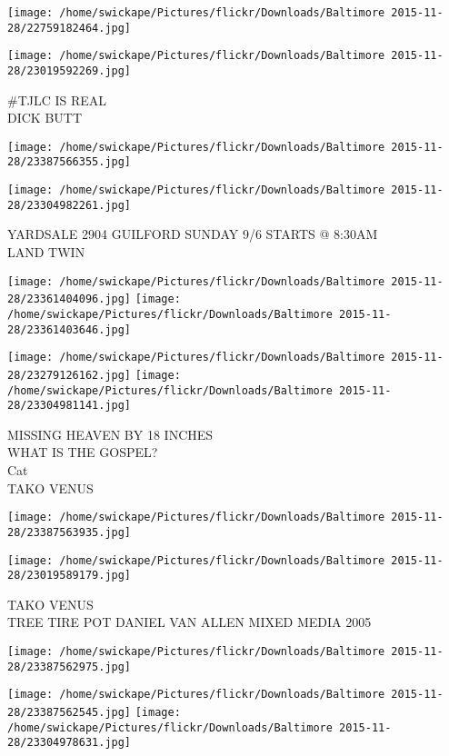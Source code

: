 \documentclass[10pt,letterpaper]{article}
\begin{document}
\texttt{[image: /home/swickape/Pictures/flickr/Downloads/Baltimore 2015-11-28/22759182464.jpg]}

\vspace{0.25in}
\texttt{[image: /home/swickape/Pictures/flickr/Downloads/Baltimore 2015-11-28/23019592269.jpg]}

\#TJLC IS REAL\\
DICK BUTT
\pagebreak

\texttt{[image: /home/swickape/Pictures/flickr/Downloads/Baltimore 2015-11-28/23387566355.jpg]}

\vspace{0.25in}
\texttt{[image: /home/swickape/Pictures/flickr/Downloads/Baltimore 2015-11-28/23304982261.jpg]}

YARDSALE 2904 GUILFORD SUNDAY 9/6 STARTS @ 8:30AM\\
LAND TWIN
\pagebreak

\texttt{[image: /home/swickape/Pictures/flickr/Downloads/Baltimore 2015-11-28/23361404096.jpg]}
\texttt{[image: /home/swickape/Pictures/flickr/Downloads/Baltimore 2015-11-28/23361403646.jpg]}

\texttt{[image: /home/swickape/Pictures/flickr/Downloads/Baltimore 2015-11-28/23279126162.jpg]}
\texttt{[image: /home/swickape/Pictures/flickr/Downloads/Baltimore 2015-11-28/23304981141.jpg]}

MISSING HEAVEN BY 18 INCHES\\
WHAT IS THE GOSPEL?\\
Cat\\
TAKO VENUS
\pagebreak

\texttt{[image: /home/swickape/Pictures/flickr/Downloads/Baltimore 2015-11-28/23387563935.jpg]}

\vspace{0.25in}
\texttt{[image: /home/swickape/Pictures/flickr/Downloads/Baltimore 2015-11-28/23019589179.jpg]}

TAKO VENUS\\
TREE TIRE POT DANIEL VAN ALLEN MIXED MEDIA 2005
\pagebreak

\texttt{[image: /home/swickape/Pictures/flickr/Downloads/Baltimore 2015-11-28/23387562975.jpg]}

\vspace{0.25in}
\texttt{[image: /home/swickape/Pictures/flickr/Downloads/Baltimore 2015-11-28/23387562545.jpg]}
\texttt{[image: /home/swickape/Pictures/flickr/Downloads/Baltimore 2015-11-28/23304978631.jpg]}
\end{document}

